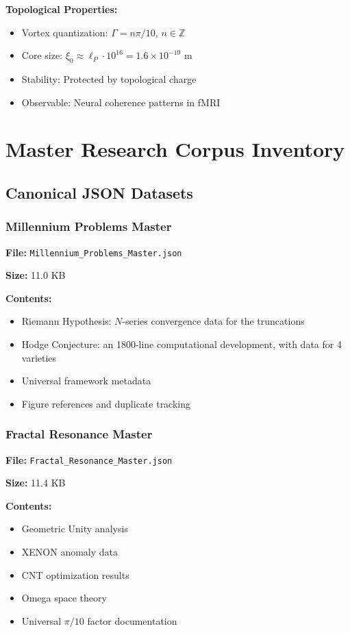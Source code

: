 \textbf{Topological Properties:}
\begin{itemize}
\item Vortex quantization: $\Gamma = n \pi/10$, $n \in \mathbb{Z}$
\item Core size: $\xi_0 \approx \ell_P \cdot 10^{16} = 1.6 \times 10^{-19}$ m%

\item Stability: Protected by topological charge
\item Observable: Neural coherence patterns in fMRI
\end{itemize}

\chapter{Master Research Corpus Inventory}

\section{Canonical JSON Datasets}

\subsection{Millennium Problems Master}
\textbf{File:} \texttt{Millennium\_Problems\_Master.json}

\textbf{Size:} 11.0 KB

\textbf{Contents:}
\begin{itemize}
\item Riemann Hypothesis: $N$-series convergence data for the truncations
\item Hodge Conjecture: an 1800-line computational development, with data for 4 varieties%

\item Universal framework metadata
\item Figure references and duplicate tracking
\end{itemize}

\subsection{Fractal Resonance Master}
\textbf{File:} \texttt{Fractal\_Resonance\_Master.json}

\textbf{Size:} 11.4 KB

\textbf{Contents:}
\begin{itemize}
\item Geometric Unity analysis
\item XENON anomaly data
\item CNT optimization results
\item Omega space theory
\item Universal $\pi/10$ factor documentation
\end{itemize}

